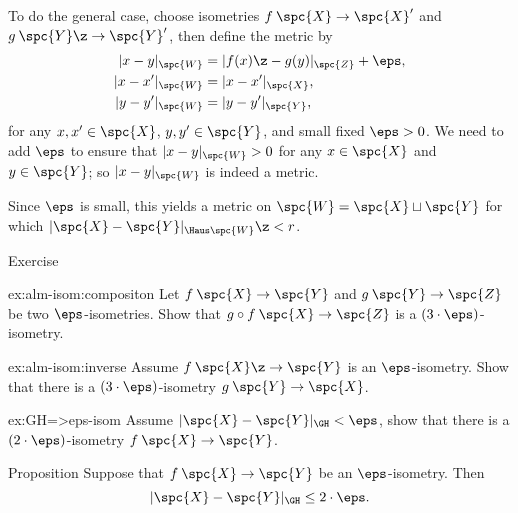 To do the general case,
choose isometries $f\: \spc{X} \to \spc{X}'$ and
$g\: \spc{Y} \z\to \spc{Y}'$, then define the metric by
\begin{align*}
|x-y|_{\spc{W}} &= |f (x)\z- g(y)|_{\spc{Z}}+\eps,
\\
|x-x'|_{\spc{W}} &= |x- x'|_{\spc{X}},
\\
|y-y'|_{\spc{W}} &= |y- y'|_{\spc{Y}},
\end{align*}
for any $x,x' \in \spc{X}$, $y,y' \in \spc{Y}$, and small fixed $\eps>0$.
We need to add $\eps$ to ensure that $|x-y|_{\spc{W}} > 0$ for any $x\in \spc{X}$ and $y\in \spc{Y}$;
so $|x-y|_{\spc{W}}$ is indeed a metric.

Since $\eps$ is small,
this yields a metric on $\spc{W}=\spc{X}\sqcup \spc{Y}$ for which
$|\spc{X}- \spc{Y}|_{\Haus\spc{W}} \z< r$.
\qeds





















\begin{thm}{Exercise}\label{ex:alm-isom}
\begin{subthm}{ex:alm-isom:compositon}
Let $f\:\spc{X}\to \spc{Y}$ and $g\:\spc{Y}\to \spc{Z}$ be two $\eps$-isometries.
Show that $g\circ f\: \spc{X}\to \spc{Z}$ is a $(3\cdot\eps)$-isometry.
\end{subthm}

\begin{subthm}{ex:alm-isom:inverse}
Assume $f\: \spc{X} \z\to \spc{Y}$ is an $\eps$-isometry.
Show that there is a $(3\cdot\eps)$-isometry 
$g\: \spc{Y}\to \spc{X}$.
\end{subthm}

\begin{subthm}{ex:GH=>eps-isom}
 Assume $|\spc{X}-\spc{Y}|_{\GH}<\eps$, show that there is a $(2\cdot\eps)$-isometry 
$f\: \spc{X}\to \spc{Y}$.
\end{subthm}
\end{thm}

\begin{thm}{Proposition}\label{prop:alm-isom=>GH}
Suppose that $f\: \spc{X}\to \spc{Y}$ be an $\eps$-isometry.
Then 
\[|\spc{X}-\spc{Y}|_{\GH}\le 2\cdot \eps.\]
\end{thm}

